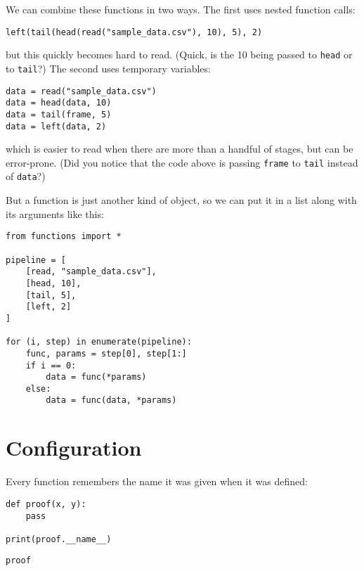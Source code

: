 \documentclass{scrbook}
\begin{document}
We can combine these functions in two ways.
The first uses nested function calls:

\begin{lstlisting}[frame=single,frameround=tttt]
left(tail(head(read("sample_data.csv"), 10), 5), 2)
\end{lstlisting}


\noindent but this quickly becomes hard to read.
(Quick, is the 10 being passed to \texttt{head} or to \texttt{tail}?)
The second uses temporary variables:

\begin{lstlisting}[frame=single,frameround=tttt]
data = read("sample_data.csv")
data = head(data, 10)
data = tail(frame, 5)
data = left(data, 2)
\end{lstlisting}


\noindent which is easier to read when there are more than a handful of stages,
but can be error-prone.
(Did you notice that the code above is passing \texttt{frame} to \texttt{tail}
instead of \texttt{data}?)


But a function is just another kind of object,
so we can put it in a list along with its arguments like this:


\begin{lstlisting}[frame=single,frameround=tttt]
from functions import *

pipeline = [
    [read, "sample_data.csv"],
    [head, 10],
    [tail, 5],
    [left, 2]
]

for (i, step) in enumerate(pipeline):
    func, params = step[0], step[1:]
    if i == 0:
        data = func(*params)
    else:
        data = func(data, *params)
\end{lstlisting}


\section{Configuration}\label{pipeline-config}


Every function remembers the name it was given when it was defined:


\begin{lstlisting}[frame=single,frameround=tttt]
def proof(x, y):
    pass

print(proof.__name__)
\end{lstlisting}



\begin{lstlisting}[frame=single,frameround=tttt]
proof
\end{lstlisting}
\end{document}
